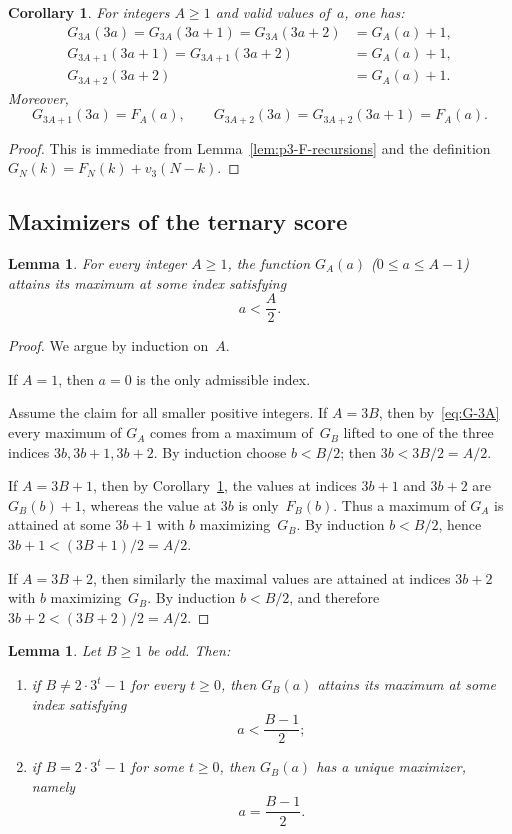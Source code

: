 \documentclass[10pt]{amsart}
\newtheorem{lemma}[theorem]{Lemma}
\newtheorem{corollary}[theorem]{Corollary}
\theoremstyle{definition}
\theoremstyle{remark}
\begin{document}
\begin{corollary}\label{cor:p3-G-recursions}
For integers $A \ge 1$ and valid values of~$a$, one has:
\begin{align}
G_{3A}(3a) = G_{3A}(3a+1) = G_{3A}(3a+2) &= G_A(a)+1,\label{eq:G-3A}\\
G_{3A+1}(3a+1) = G_{3A+1}(3a+2) &= G_A(a)+1,\label{eq:G-3Aplus1}\\
G_{3A+2}(3a+2) &= G_A(a)+1.\label{eq:G-3Aplus2}
\end{align}
Moreover,
\[
G_{3A+1}(3a)=F_A(a),\qquad
G_{3A+2}(3a)=G_{3A+2}(3a+1)=F_A(a).
\]
\end{corollary}

\begin{proof}
This is immediate from Lemma~\ref{lem:p3-F-recursions} and the definition
$G_N(k)=F_N(k)+v_3(N-k)$.
\end{proof}

\subsection{Maximizers of the ternary score}

\begin{lemma}\label{lem:G-lower-half}
For every integer $A \ge 1$, the function $G_A(a)$
($0 \le a \le A-1$) attains its maximum at some index satisfying
\[
a < \frac{A}{2}.
\]
\end{lemma}

\begin{proof}
We argue by induction on~$A$.

If $A=1$, then $a=0$ is the only admissible index.

Assume the claim for all smaller positive integers.
If $A=3B$, then by~\eqref{eq:G-3A} every maximum of $G_A$
comes from a maximum of~$G_B$ lifted to one of the three indices
$3b,3b+1,3b+2$.  By induction choose $b < B/2$; then
$3b < 3B/2 = A/2$.

If $A=3B+1$, then by Corollary~\ref{cor:p3-G-recursions},
the values at indices $3b+1$ and $3b+2$ are
$G_B(b)+1$, whereas the value at $3b$ is only~$F_B(b)$.
Thus a maximum of $G_A$ is attained at some $3b+1$ with
$b$ maximizing~$G_B$.  By induction $b < B/2$, hence
$3b+1 < (3B+1)/2 = A/2$.

If $A=3B+2$, then similarly the maximal values are attained at indices
$3b+2$ with $b$ maximizing~$G_B$.  By induction $b < B/2$, and therefore
$3b+2 < (3B+2)/2 = A/2$.
\end{proof}

\begin{lemma}\label{lem:G-odd-sharp}
Let $B \ge 1$ be odd.  Then:
\begin{enumerate}[label=\textup{(\roman*)}]
\item if $B \ne 2\cdot 3^t - 1$ for every $t \ge 0$, then $G_B(a)$ attains
its maximum at some index satisfying
\[
a < \frac{B-1}{2};
\]
\item if $B = 2\cdot 3^t - 1$ for some $t \ge 0$, then
$G_B(a)$ has a unique maximizer, namely
\[
a = \frac{B-1}{2}.
\]
\end{enumerate}
\end{lemma}
\end{document}
